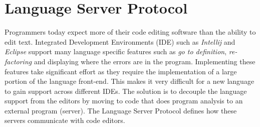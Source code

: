 \documentclass[../thesis.tex]{subfiles}
\begin{document}

\section{Language Server Protocol}
Programmers today expect more of their code editing software than the ability to edit text.
Integrated Development Environments (IDE) such as \textit{Intellij} and \textit{Eclipse} support many language specific features such as \textit{go to definition}, \textit{re-factoring}
and displaying where the errors are in the program.
Implementing these features take significant effort as they require the implementation of a large portion of the language front-end.
This makes it very difficult for a new language to gain support across different IDEs.
The solution is to decouple the language support from the editors by moving to code that does program analysis to an external program (server).
The Language Server Protocol defines how these servers communicate with code editors.
\end{document}
